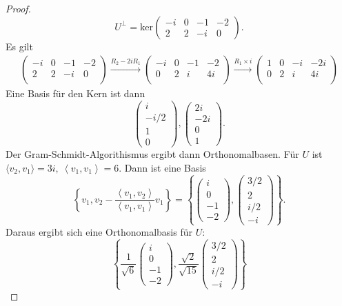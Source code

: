 \begin{proof}
	\[
		U^\perp=\text{ker}\begin{pmatrix} -i & 0 & -1 & -2 \\ 2 & 2 & -i &0 \end{pmatrix} 
	.\] 
Es gilt
\begin{gather*}
\left(
\begin{array}{cccc}
 -i & 0 & -1 & -2 \\
 2 & 2 & -i & 0 \\
\end{array}
\right) \xrightarrow{R_2-2iR_1} \left(
\begin{array}{cccc}
 -i & 0 & -1 & -2 \\
 0 & 2 & i & 4 i \\
\end{array}
\right) \xrightarrow{R_1\times i} \left(
\begin{array}{cccc}
 1 & 0 & -i & -2 i \\
 0 & 2 & i & 4 i \\
\end{array}
\right)	
\end{gather*}
Eine Basis f\"{u}r den Kern ist dann
\[
\begin{pmatrix} i \\ -i / 2 \\ 1 \\ 0 \end{pmatrix} , \begin{pmatrix}  2i \\ -2i \\ 0 \\ 1\end{pmatrix} 
.\] 
Der Gram-Schmidt-Algorithismus ergibt dann Orthonomalbasen. F\"{u}r $U$ ist $\langle v_2,v_1\rangle=3i,~\left<v_1,v_1 \right> = 6$. Dann ist eine Basis
\[
	\left\{	v_1,v_2-\frac{\left<v_1,v_2 \right>}{\left<v_1,v_1 \right>}v_1\right\}=\left\{ \begin{pmatrix} i \\ 0 \\ -1 \\ -2 \end{pmatrix} , \begin{pmatrix} 3 / 2 \\ 2 \\ i / 2 \\ -i \end{pmatrix}  \right\} 
.\] 
Daraus ergibt sich eine Orthonomalbasis f\"{u}r $U$:
\[
\left\{ \frac{1}{\sqrt{6} }\begin{pmatrix} i \\ 0 \\ -1 \\ -2 \end{pmatrix} , \frac{\sqrt{2} }{\sqrt{15} }\begin{pmatrix} 3 / 2 \\ 2 \\ i / 2 \\ -i \end{pmatrix}  \right\} 
\]
\end{proof}

